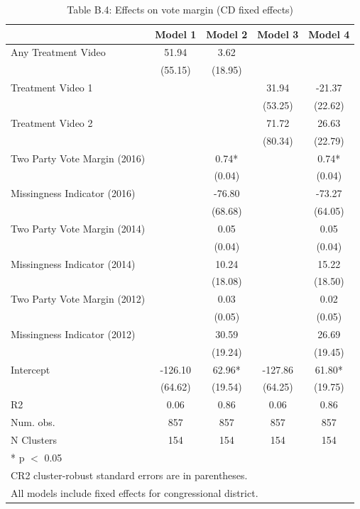 \begin{table}
\centering
\caption{Table B.4: Effects on vote margin (CD fixed effects)}
\centering
\begin{tabular}[t]{lcccc}
\toprule
  & Model 1 & Model 2 & Model 3 & Model 4\\
\midrule
Any Treatment Video & 51.94 & 3.62 &  & \\
 & (55.15) & (18.95) &  & \\
Treatment Video 1 &  &  & 31.94 & -21.37\\
 &  &  & (53.25) & (22.62)\\
Treatment Video 2 &  &  & 71.72 & 26.63\\
 &  &  & (80.34) & (22.79)\\
Two Party Vote Margin (2016) &  & 0.74* &  & 0.74*\\
 &  & (0.04) &  & \vphantom{1} (0.04)\\
Missingness Indicator (2016) &  & -76.80 &  & -73.27\\
 &  & (68.68) &  & (64.05)\\
Two Party Vote Margin (2014) &  & 0.05 &  & 0.05\\
 &  & (0.04) &  & (0.04)\\
Missingness Indicator (2014) &  & 10.24 &  & 15.22\\
 &  & (18.08) &  & (18.50)\\
Two Party Vote Margin (2012) &  & 0.03 &  & 0.02\\
 &  & (0.05) &  & (0.05)\\
Missingness Indicator (2012) &  & 30.59 &  & 26.69\\
 &  & (19.24) &  & (19.45)\\
Intercept & -126.10 & 62.96* & -127.86 & 61.80*\\
 & (64.62) & (19.54) & (64.25) & (19.75)\\
\midrule
R2 & 0.06 & 0.86 & 0.06 & 0.86\\
Num. obs. & 857 & 857 & 857 & 857\\
N Clusters & 154 & 154 & 154 & 154\\
\bottomrule
\multicolumn{5}{l}{\rule{0pt}{1em}* p $<$ 0.05}\\
\multicolumn{5}{l}{\rule{0pt}{1em}CR2 cluster-robust standard errors are in parentheses.}\\
\multicolumn{5}{l}{\rule{0pt}{1em}All models include fixed effects for congressional district.}\\
\end{tabular}
\end{table}
